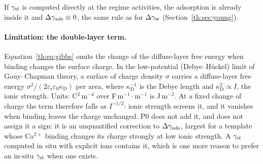 If $\gamma_\mathrm{sl}$ is computed directly at the regime activities, the adsorption is already inside it and
$\Delta\gamma_\mathrm{ads}\equiv0$, the same rule as for $\Delta\gamma_\mathrm{w}$ (Section~\ref{th:sec:young}).

\paragraph{Limitation: the double-layer term.} Equation~\eqref{th:eq:gibbs} omits the change of
the diffuse-layer free energy when binding changes the surface charge. In the low-potential
(Debye--H\"uckel) limit of Gouy--Chapman theory, a surface of charge density $\sigma$ carries a
diffuse-layer free energy $\sigma^{2}/(2\varepsilon_\mathrm{r}\varepsilon_0\kappa_\mathrm{D})$ per
area, where $\kappa_\mathrm{D}^{-1}$ is the Debye length and $\kappa_\mathrm{D}^{2}\propto I$, the
ionic strength. Units: C$^{2}$\,m$^{-4}$ over F\,m$^{-1}\cdot$m$^{-1}$ is J\,m$^{-2}$. At a fixed
change of charge the term therefore falls as $I^{-1/2}$: ionic strength screens it, and it
vanishes when binding leaves the charge unchanged. P0 does not add it, and does not assign it a
sign: it is an unquantified correction to $\Delta\gamma_\mathrm{ads}$, largest for a template whose Ca$^{2+}$ binding
changes its charge strongly at low ionic strength. A $\gamma_\mathrm{sl}$ computed in situ with explicit ions
contains it, which is one more reason to prefer an in-situ $\gamma_\mathrm{sl}$ when one exists.


